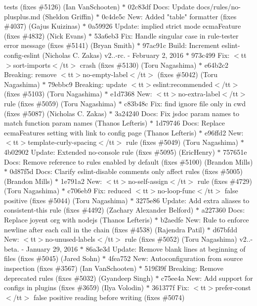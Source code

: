 \begin{DoxyItemize}
tests (fixes \#5126) (\+Ian Van\+Schooten) \texorpdfstring{$\ast$}{*} 02c83df Docs\+: Update docs/rules/no-\/plusplus.\+md (\+Sheldon Griffin) \texorpdfstring{$\ast$}{*} 0c4de5c New\+: Added "{}table"{} formatter (fixes \#4037) (\+Gajus Kuizinas) \texorpdfstring{$\ast$}{*} 0a59926 Update\+: \textquotesingle{}implied strict mode\textquotesingle{} ecma\+Feature (fixes \#4832) (\+Nick Evans) \texorpdfstring{$\ast$}{*} 53a6eb3 Fix\+: Handle singular case in rule-\/tester error message (fixes \#5141) (\+Bryan Smith) \texorpdfstring{$\ast$}{*} 97ac91c Build\+: Increment eslint-\/config-\/eslint (\+Nicholas C. Zakas)  v2..-\/rc. -\/ February 2, 2016  \texorpdfstring{$\ast$}{*} 973c499 Fix\+: $<$tt$>$sort-\/imports$<$/tt$>$ crash (fixes \#5130) (\+Toru Nagashima) \texorpdfstring{$\ast$}{*} e64b2c2 Breaking\+: remove $<$tt$>$no-\/empty-\/label$<$/tt$>$ (fixes \#5042) (\+Toru Nagashima) \texorpdfstring{$\ast$}{*} 79ebbc9 Breaking\+: update $<$tt$>$eslint\+:recommended$<$/tt$>$ (fixes \#5103) (\+Toru Nagashima) \texorpdfstring{$\ast$}{*} e1d7368 New\+: $<$tt$>$no-\/extra-\/label$<$/tt$>$ rule (fixes \#5059) (\+Toru Nagashima) \texorpdfstring{$\ast$}{*} c83b48c Fix\+: find ignore file only in cwd (fixes \#5087) (\+Nicholas C. Zakas) \texorpdfstring{$\ast$}{*} 3a24240 Docs\+: Fix jsdoc param names to match function param names (\+Thanos Lefteris) \texorpdfstring{$\ast$}{*} 1d79746 Docs\+: Replace ecma\+Features setting with link to config page (\+Thanos Lefteris) \texorpdfstring{$\ast$}{*} e96ffd2 New\+: $<$tt$>$template-\/curly-\/spacing$<$/tt$>$ rule (fixes \#5049) (\+Toru Nagashima) \texorpdfstring{$\ast$}{*} 4b02902 Update\+: Extended no-\/console rule (fixes \#5095) (\+Eric\+Henry) \texorpdfstring{$\ast$}{*} 757651e Docs\+: Remove reference to rules enabled by default (fixes \#5100) (\+Brandon Mills) \texorpdfstring{$\ast$}{*} 0d87f5d Docs\+: Clarify eslint-\/disable comments only affect rules (fixes \#5005) (\+Brandon Mills) \texorpdfstring{$\ast$}{*} 1e791a2 New\+: $<$tt$>$no-\/self-\/assign$<$/tt$>$ rule (fixes \#4729) (\+Toru Nagashima) \texorpdfstring{$\ast$}{*} c706eb9 Fix\+: reduced $<$tt$>$no-\/loop-\/func$<$/tt$>$ false positive (fixes \#5044) (\+Toru Nagashima) \texorpdfstring{$\ast$}{*} 3275e86 Update\+: Add extra aliases to consistent-\/this rule (fixes \#4492) (\+Zachary Alexander Belford) \texorpdfstring{$\ast$}{*} a227360 Docs\+: Replace joyent org with nodejs (\+Thanos Lefteris) \texorpdfstring{$\ast$}{*} b2aedfe New\+: Rule to enforce newline after each call in the chain (fixes \#4538) (\+Rajendra Patil) \texorpdfstring{$\ast$}{*} d67bfdd New\+: $<$tt$>$no-\/unused-\/labels$<$/tt$>$ rule (fixes \#5052) (\+Toru Nagashima)  v2..-\/beta. -\/ January 29, 2016  \texorpdfstring{$\ast$}{*} 86a3e3d Update\+: Remove blank lines at beginning of files (fixes \#5045) (\+Jared Sohn) \texorpdfstring{$\ast$}{*} 4fea752 New\+: Autoconfiguration from source inspection (fixes \#3567) (\+Ian Van\+Schooten) \texorpdfstring{$\ast$}{*} 519f39f Breaking\+: Remove deprecated rules (fixes \#5032) (\+Gyandeep Singh) \texorpdfstring{$\ast$}{*} c75ee4a New\+: Add support for configs in plugins (fixes \#3659) (\+Ilya Volodin) \texorpdfstring{$\ast$}{*} 361377f Fix\+: $<$tt$>$prefer-\/const$<$/tt$>$ false positive reading before writing (fixes \#5074) 
\end{DoxyItemize}
